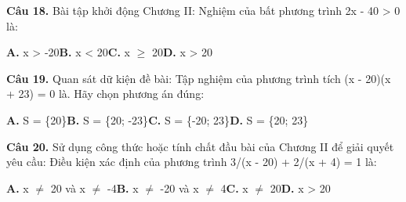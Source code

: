 \documentclass[11pt,a4paper]{article}
\begin{document}
\textbf{\color{primary} Câu 18.} Bài tập khởi động Chương II: Nghiệm của bất phương trình 2x - 40 > 0 là:\par
\hspace*{1.5em}\textbf{A.} x > -20\quad\quad \textbf{B.} x < 20\quad\quad \textbf{C.} x $\ge$ 20\quad\quad \textbf{D.} x > 20\par\vspace{2pt}
\textbf{\color{primary} Câu 19.} Quan sát dữ kiện đề bài: Tập nghiệm của phương trình tích (x - 20)(x + 23) = 0 là. Hãy chọn phương án đúng:\par
\hspace*{1.5em}\textbf{A.} S = \{20\}\quad\quad \textbf{B.} S = \{20; -23\}\quad\quad \textbf{C.} S = \{-20; 23\}\quad\quad \textbf{D.} S = \{20; 23\}\par\vspace{2pt}
\textbf{\color{primary} Câu 20.} Sử dụng công thức hoặc tính chất đầu bài của Chương II để giải quyết yêu cầu: Điều kiện xác định của phương trình 3/(x - 20) + 2/(x + 4) = 1 là:\par
\hspace*{1.5em}\textbf{A.} x $\ne$ 20 và x $\ne$ -4\quad\quad \textbf{B.} x $\ne$ -20 và x $\ne$ 4\quad\quad \textbf{C.} x $\ne$ 20\quad\quad \textbf{D.} x > 20\par\vspace{2pt}
\end{document}
